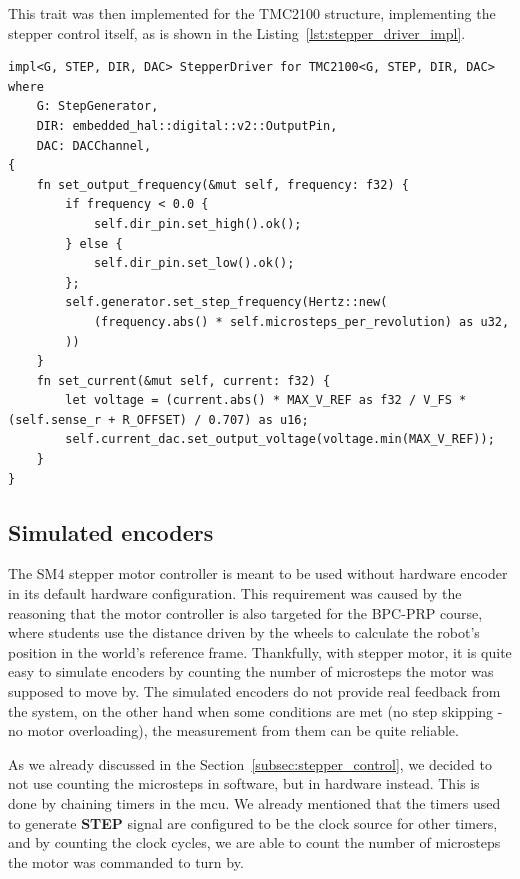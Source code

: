 This trait was then implemented for the TMC2100 structure, implementing the stepper control itself, as is shown in the Listing~\ref{lst:stepper_driver_impl}.

\begin{lstlisting}[caption={Implementing the StepperDriver trait for TMC2100.},label=lst:stepper_driver_impl]
impl<G, STEP, DIR, DAC> StepperDriver for TMC2100<G, STEP, DIR, DAC>
where
    G: StepGenerator,
    DIR: embedded_hal::digital::v2::OutputPin,
    DAC: DACChannel,
{
    fn set_output_frequency(&mut self, frequency: f32) {
        if frequency < 0.0 {
            self.dir_pin.set_high().ok();
        } else {
            self.dir_pin.set_low().ok();
        };
        self.generator.set_step_frequency(Hertz::new(
            (frequency.abs() * self.microsteps_per_revolution) as u32,
        ))
    }
    fn set_current(&mut self, current: f32) {
        let voltage = (current.abs() * MAX_V_REF as f32 / V_FS * (self.sense_r + R_OFFSET) / 0.707) as u16;
        self.current_dac.set_output_voltage(voltage.min(MAX_V_REF));
    }
}
\end{lstlisting}

\subsection{Simulated encoders}
\label{subsec:simulated_encoders}
The SM4 stepper motor controller is meant to be used without hardware encoder in its default hardware configuration.
This requirement was caused by the reasoning that the motor controller is also targeted for the BPC-PRP course, where students use the distance driven by the wheels to calculate the robot's position in the world's reference frame.
Thankfully, with stepper motor, it is quite easy to simulate encoders by counting the number of microsteps the motor was supposed to move by.
The simulated encoders do not provide real feedback from the system, on the other hand when some conditions are met (no step skipping - no motor overloading), the measurement from them can be quite reliable.

As we already discussed in the Section~\ref{subsec:stepper_control}, we decided to not use counting the microsteps in software, but in hardware instead.
This is done by chaining timers in the \acs{mcu}.
We already mentioned that the timers used to generate \textbf{STEP} signal are configured to be the clock source for other timers, and by counting the clock cycles, we are able to count the number of microsteps the motor was commanded to turn by.

